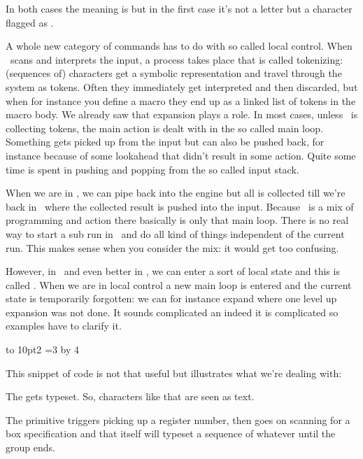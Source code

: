 \starttyping[option=TEX]
\edef{}
\edef\TestLA{\expandtoken\lettercatcode`A}
\stoptyping

In both cases the meaning is  but in the first case it's not a letter
but a character flagged as .

A whole new category of commands has to do with so called local control. When
\TEX\ scans and interprets the input, a process takes place that is called
tokenizing: (sequences of) characters get a symbolic representation and travel
through the system as tokens. Often they immediately get interpreted and then
discarded, but when for instance you define a macro they end up as a linked list
of tokens in the macro body. We already saw that expansion plays a role. In most
cases, unless \TEX\ is collecting tokens, the main action is dealt with in the so
called main loop. Something gets picked up from the input but can also be pushed
back, for instance because of some lookahead that didn't result in some action.
Quite some time is spent in pushing and popping from the so called input stack.

When we are in \LUA, we can pipe back into the engine but all is collected till
we're back in \TEX\ where the collected result is pushed into the input. Because
\TEX\ is a mix of programming and action there basically is only that main loop.
There is no real way to start a sub run in \LUA\ and do all kind of things
independent of the current run. This makes sense when you consider the mix: it
would get too confusing.

However, in \LUATEX\ and even better in \LUAMETATEX, we can enter a sort of local
state and this is called . When we are in local control a
new main loop is entered and the current state is temporarily forgotten: we can for
instance expand where one level up expansion was not done. It sounds complicated
an indeed it is complicated so examples have to clarify it.

 \hbox to 10pt{2} =3 \the{} \multiply{} by 4
\stoptyping

This snippet of code is not that useful but illustrates what we're dealing with:

\startitemize

\startitem
    The  gets typeset. So, characters like that are seen as text.
\stopitem

\startitem
    The \type {\setbox} primitive triggers picking up a register number, then
    goes on scanning for a box specification and that itself will typeset a
    sequence of whatever until the group ends.
\stopitem

